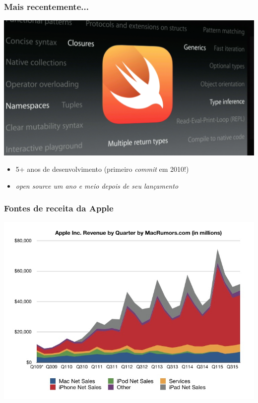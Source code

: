 \documentclass[xcolor=dvipsnames]{beamer}
\begin{document}
\begin{frame}
	\frametitle{Mais recentemente...}
 	\includegraphics[scale=0.22]{swift_logo.png}	
    \begin{itemize}
      \item 5+ anos de desenvolvimento (primeiro \textit{commit} em 2010!)
      \item \textit{open source um ano e meio depois de seu lançamento}
    \end{itemize}
\end{frame}

\begin{frame}
	\frametitle{Fontes de receita da Apple}
 	\includegraphics[scale=0.38]{apple_revenue.jpg}	
\end{frame}
\end{document}
